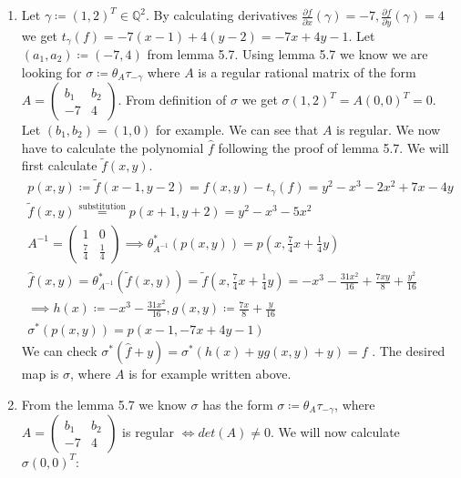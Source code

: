 \documentclass[12pt, a4paper]{article}
\begin{document}
\section{}
\begin{enumerate}[label=(\alph*)]
\item Let $\gamma \coloneqq (1,2)^T \in \mathbb{Q}^2$. By calculating derivatives $\frac{\partial f}{\partial x} (\gamma) = -7, \frac{\partial f}{\partial y} (\gamma) = 4$ we get $t_{\gamma}(f) = -7(x-1)+4(y-2) = -7x+4y-1$. Let $(a_1,a_2) \coloneqq (-7,4)$ from lemma 5.7. Using lemma 5.7 we know we are looking for $\sigma \coloneqq \theta_A \tau_{-\gamma}$ where $A$ is a regular rational matrix of the form $A = \begin{pmatrix}b_1 & b_2 \\ -7 & 4\end{pmatrix}$. From definition of $\sigma$ we get $\sigma(1,2)^T = A(0,0)^T = 0$.\\
Let $(b_1,b_2)=(1,0)$ for example. We can see that $A$ is regular. We now have to calculate the polynomial $\hat{f}$ following the proof of lemma 5.7. We will first calculate $\tilde{f}(x,y)$.
\begin{gather*}
p(x,y) \coloneqq \tilde{f}(x-1,y-2) = f(x,y)-t_\gamma(f)= y^2-x^3-2x^2+7x-4y\\
\tilde{f}(x,y) \stackrel{\text{substitution}}{=} p(x+1,y+2) = y^2-x^3-5x^2\\
A^{-1} = \begin{pmatrix}
1 & 0\\
\frac{7}{4} & \frac{1}{4}
\end{pmatrix} \implies \theta_{A^{-1}}^*(p(x,y)) = p(x, \frac{7}{4}x+\frac{1}{4}y)\\
\hat{f}(x,y) = \theta_{A^{-1}}^*(\tilde{f}(x,y))=\tilde{f}(x, \frac{7}{4}x+\frac{1}{4}y) = -x^3-\frac{31 x^2}{16}+\frac{7 x y}{8}+\frac{y^2}{16}\\
\implies h(x)\coloneqq -x^3-\frac{31 x^2}{16}, g(x,y) \coloneqq \frac{7 x}{8}+\frac{y}{16}\\
\sigma^*(p(x,y)) = p(x-1, -7x+4y-1)
\end{gather*}
We can check $\sigma^*(\hat{f}+y) = \sigma^*(h(x)+yg(x,y)+y) =  f$ . The desired map is $\sigma$, where $A$ is for example written above.
\item From the lemma 5.7 we know $\sigma$ has the form $\sigma \coloneqq \theta_A \tau_{-\gamma}$, where $A = \begin{pmatrix}b_1 & b_2 \\ -7 & 4\end{pmatrix}$ is regular $\iff det(A) \neq 0$. We will now calculate $\sigma(0,0)^T:$

\end{enumerate}
\end{document}
